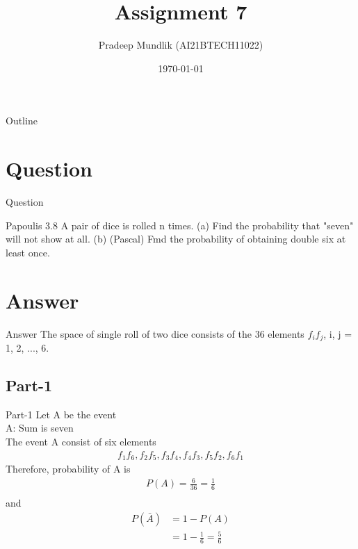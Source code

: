 \documentclass{beamer}
\title{Assignment 7}
\author{Pradeep Mundlik (AI21BTECH11022)}
\date{\today}
\begin{document}
\begin{frame}
    \titlepage 
\end{frame}



\begin{frame}{Outline}
    \tableofcontents
\end{frame}

\section{Question}
\begin{frame}{Question}
    \begin{block}{Papoulis 3.8}
        A pair of dice is rolled n times. (a) Find the probability that "seven" will not show
at all. (b) (Pascal) Fmd the probability of obtaining double six at least once. 
    \end{block}
\end{frame}

\section{Answer}
\begin{frame}{Answer}
    The space of single roll of two dice consists of the 36 elements $f_if_j$, i, j = 1, 2, ..., 6. 
\end{frame}

\subsection{Part-1}
\begin{frame}{Part-1}
    Let A be the event \\
    A: Sum is seven \\
    The event A consist of six elements \\
    \begin{align}
        f_1f_6, f_2f_5, f_3f_4, f_4f_3, f_5f_2, f_6f_1 
    \end{align}
    Therefore, probability of A is
    \begin{align}
        P(A) = \frac{6}{36} = \frac{1}{6} \\
    \end{align}
    and 
    \begin{align}
        P(\bar{A}) &= 1 - P(A) \\
                   &= 1 - \frac{1}{6} = \frac{5}{6}
    \end{align}
\end{frame}
\end{document}
